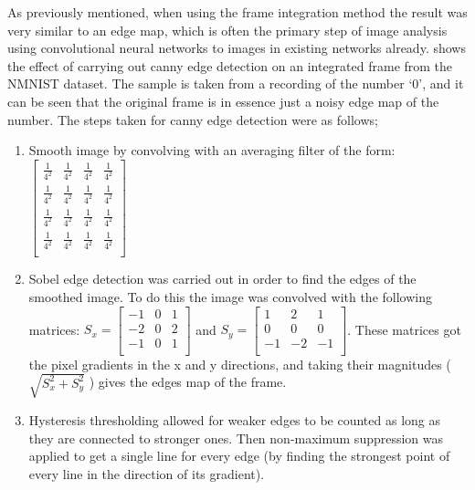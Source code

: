 As previously mentioned, when using the frame integration method the result was very similar to an edge map, which is often the primary step of image analysis using convolutional neural networks to images in existing networks already.  shows the effect of carrying out canny edge detection\cite{CannyEdgeDetection} on an integrated frame from the NMNIST dataset. The sample is taken from a recording of the number `0', and it can be seen that the original frame is in essence just a noisy edge map of the number. The steps taken for canny edge detection were as follows;

\begin{enumerate}
    \item Smooth image by convolving with an averaging filter of the form: $ \begin{bmatrix}
        \frac{1}{4^2} & \frac{1}{4^2}  & \frac{1}{4^2}  & \frac{1}{4^2} \\
        \frac{1}{4^2} & \frac{1}{4^2}  & \frac{1}{4^2}  & \frac{1}{4^2} \\
        \frac{1}{4^2} & \frac{1}{4^2}  & \frac{1}{4^2}  & \frac{1}{4^2} \\
        \frac{1}{4^2} & \frac{1}{4^2}  & \frac{1}{4^2}  & \frac{1}{4^2} \\
    \end{bmatrix} $
    \item Sobel edge detection was carried out in order to find the edges of the smoothed image. To do this the image was convolved with the following matrices: $ S_x =
    \begin{bmatrix}
        -1 & 0 & 1 \\
        -2 & 0 & 2 \\
        -1 & 0 & 1 \\
    \end{bmatrix} $ and $ S_y = 
    \begin{bmatrix}
        1 & 2 & 1 \\
        0 & 0 & 0 \\
        -1 & -2 & -1 \\
    \end{bmatrix} $. These matrices got the pixel gradients in the x and y directions, and taking their magnitudes ( $ \sqrt{S_x^2 + S_y^2} $ ) gives the edges map of the frame.
    \item Hysteresis thresholding allowed for weaker edges to be counted as long as they are connected to stronger ones. Then non-maximum suppression was applied to get a single line for every edge (by finding the strongest point of every line in the direction of its gradient).
\end{enumerate}

